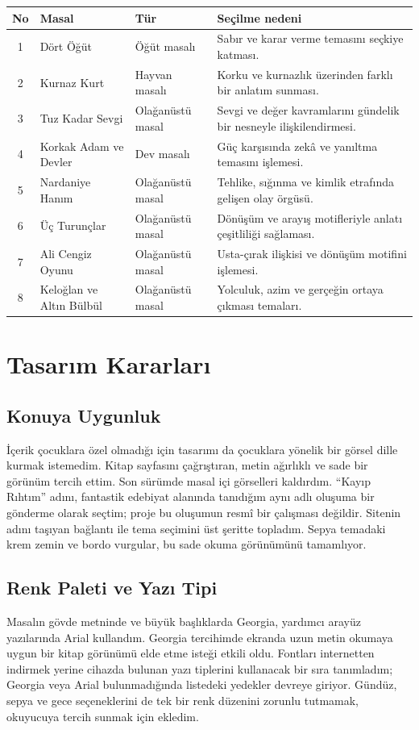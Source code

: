\documentclass[12pt,a4paper]{article}
\begin{document}
\begin{longtable}{@{}cp{3.5cm}p{2.6cm}p{5.5cm}@{}}
\toprule
\textbf{No} & \textbf{Masal} & \textbf{Tür} & \textbf{Seçilme nedeni} \\
\midrule
\endhead
1 & Dört Öğüt & Öğüt masalı & Sabır ve karar verme temasını seçkiye katması. \\
2 & Kurnaz Kurt & Hayvan masalı & Korku ve kurnazlık üzerinden farklı bir anlatım sunması. \\
3 & Tuz Kadar Sevgi & Olağanüstü masal & Sevgi ve değer kavramlarını gündelik bir nesneyle ilişkilendirmesi. \\
4 & Korkak Adam ve Devler & Dev masalı & Güç karşısında zekâ ve yanıltma temasını işlemesi. \\
5 & Nardaniye Hanım & Olağanüstü masal & Tehlike, sığınma ve kimlik etrafında gelişen olay örgüsü. \\
6 & Üç Turunçlar & Olağanüstü masal & Dönüşüm ve arayış motifleriyle anlatı çeşitliliği sağlaması. \\
7 & Ali Cengiz Oyunu & Olağanüstü masal & Usta-çırak ilişkisi ve dönüşüm motifini işlemesi. \\
8 & Keloğlan ve Altın Bülbül & Olağanüstü masal & Yolculuk, azim ve gerçeğin ortaya çıkması temaları. \\
\bottomrule
\end{longtable}

\section{Tasarım Kararları}


\subsection{Konuya Uygunluk}
İçerik çocuklara özel olmadığı için tasarımı da çocuklara yönelik bir görsel dille kurmak istemedim. Kitap sayfasını çağrıştıran, metin ağırlıklı ve sade bir görünüm tercih ettim. Son sürümde masal içi görselleri kaldırdım. ``Kayıp Rıhtım'' adını, fantastik edebiyat alanında tanıdığım aynı adlı oluşuma bir gönderme olarak seçtim; proje bu oluşumun resmî bir çalışması değildir. Sitenin adını taşıyan bağlantı ile tema seçimini üst şeritte topladım. Sepya temadaki krem zemin ve bordo vurgular, bu sade okuma görünümünü tamamlıyor.

\subsection{Renk Paleti ve Yazı Tipi}
Masalın gövde metninde ve büyük başlıklarda Georgia, yardımcı arayüz yazılarında Arial kullandım. Georgia tercihimde ekranda uzun metin okumaya uygun bir kitap görünümü elde etme isteği etkili oldu. Fontları internetten indirmek yerine cihazda bulunan yazı tiplerini kullanacak bir sıra tanımladım; Georgia veya Arial bulunmadığında listedeki yedekler devreye giriyor. Gündüz, sepya ve gece seçeneklerini de tek bir renk düzenini zorunlu tutmamak, okuyucuya tercih sunmak için ekledim.
\end{document}

